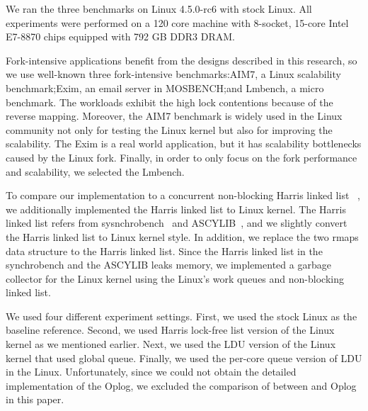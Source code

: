 We ran the three benchmarks on Linux 4.5.0-rc6 with stock Linux. 
All experiments were performed on a 120 core machine with 8-socket, 15-core
Intel E7-8870 chips equipped with 792 GB DDR3 DRAM.

Fork-intensive applications benefit from the designs described in this
research, so we use well-known three fork-intensive benchmarks:AIM7, a Linux
scalability benchmark;Exim, an email server in MOSBENCH;and Lmbench, a micro
benchmark.
The workloads exhibit the high lock contentions because of the reverse mapping.
Moreover, the AIM7 benchmark is widely used in the Linux community not only for
testing the Linux kernel but also for improving the scalability. 
The Exim is a real world application, but it has scalability bottlenecks caused
by the Linux fork.
Finally, in order to only focus on the fork performance and scalability, we
selected the Lmbench.

To compare our  implementation to a concurrent non-blocking
Harris linked list ~\cite{Harris2001Lockfree}, we additionally implemented the
Harris linked list to Linux kernel.
The Harris linked list refers from sysnchrobench~\cite{Gramoli2015Synchrobench}
and ASCYLIB~\cite{David2015ASYNCHRONIZED}, and we slightly convert the
Harris linked list to Linux kernel style.
In addition, we replace the two rmaps data structure to the Harris linked list.
Since the Harris linked list in the synchrobench and the ASCYLIB leaks memory,
we implemented a garbage collector for the Linux kernel using the Linux's work
queues and non-blocking linked list.

We used four different experiment settings. 
First, we used the stock Linux as the baseline reference. 
Second, we used Harris lock-free list version of the Linux kernel as we
mentioned earlier.
Next, we used the LDU version of the Linux kernel that used global queue.
Finally, we used the per-core queue version of LDU in the Linux.
Unfortunately, since we could not obtain the detailed implementation of the
Oplog, we excluded the comparison of between  and Oplog in this paper.

